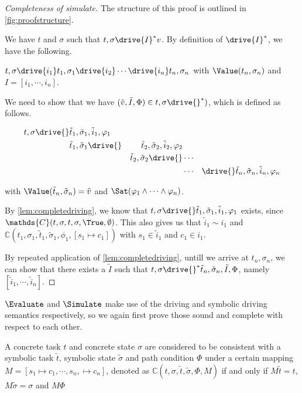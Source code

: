 \begin{proof}[Completeness of simulate]
  The structure of this proof is outlined in \cref{fig:proofstructure}.

  We have $t$ and $\sigma$ such that $t,\sigma\drive{I}^*v$.
  By definition of $\drive{I}^*$, we have the following.

  $t,\sigma\drive{i_1}t_1,\sigma_1\drive{i_2}\cdots \drive{i_n}t_n,\sigma_n$ with $\Value(t_n,\sigma_n)$ and $I=[i_1,\cdots,i_n]$.

  We need to show that we have $(\tilde{v},\tilde{I},\Phi)\in t,\sigma\drive{}^*)$,
  which is defined as follows.

  \begin{align*}
      t,\sigma\drive{}&\tilde{t}_1,\tilde{\sigma}_1,\tilde{i}_1,\phi_1&\\
                      &\tilde{t}_1,\tilde{\sigma}_1\drive{}&\tilde{t}_2,\tilde{\sigma}_2,\tilde{i}_2,\phi_2\\
                      &                                    &\tilde{t}_2,\tilde{\sigma}_2\drive{}&\cdots&\\
                      &                                    &                                    &\cdots&
                      \drive{}\tilde{t}_n,\tilde{\sigma}_n,\tilde{i}_n,\phi_n
  \end{align*}

  with $\Value(\tilde{t}_n,\tilde{\sigma}_n)=\tilde{v}$ and $\Sat(\phi_1\land\cdots\land\phi_n)$.

  By \cref{lem:completedriving}, we know that $t,\sigma\drive{}\tilde{t}_1,\tilde{\sigma}_1,\tilde{i}_1,\phi_1$ exists,
  since $\mathds{C}(t,\sigma,t,\sigma,\True,\emptyset)$.
  This also gives us that $\tilde{i}_1\sim i_1$ and $\mathds{C}(t_1,\sigma_1,\tilde{t}_1,\tilde{\sigma}_1,\phi_1,[s_1\mapsto c_1])$ with $s_1\in\tilde{i}_1$ and $c_1\in i_1$.

  By repeated application of \cref{lem:completedriving}, untill we arrive at $t_n,\sigma_n$,
  we can show that there exists a $\tilde{I}$ such that $t,\sigma\drive{}^*\tilde{t}_n,\tilde{\sigma}_n,\tilde{I},\Phi$,
  namely $[\tilde{i}_1,\cdots,\tilde{i}_n]$.

\end{proof}

$\Evaluate$ and $\Simulate$ make use of the driving and symbolic driving semantics respectively, so we again first prove those sound and complete with respect to each other.


\begin{definition}
A concrete task $t$ and concrete state $\sigma$
are considered to be consistent with a symbolic task $\tilde{t}$, symbolic state $\tilde{\sigma}$ and path condition $\Phi$
under a certain mapping $M=[s_1\mapsto c_1,\cdots,s_n,\mapsto c_n]$, denoted as $\mathds{C}(t,\sigma,\tilde{t},\tilde{\sigma},\Phi,M)$
if and only if $M\tilde{t}=t$, $M\tilde{\sigma}=\sigma$ and $M\Phi$
\end{definition}

